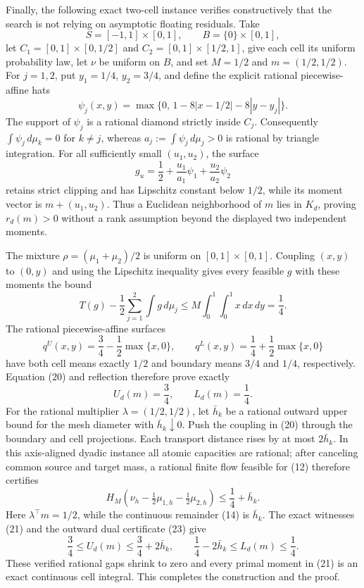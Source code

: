 Finally, the following exact two-cell instance verifies constructively that
the search is not relying on asymptotic floating residuals.  Take
\[
 S=[-1,1]\times[0,1],\qquad B=\{0\}\times[0,1],
\]
let \(C_1=[0,1]\times[0,1/2]\) and
\(C_2=[0,1]\times[1/2,1]\), give each cell its uniform probability law, let
\(\nu\) be uniform on \(B\), and set \(M=1/2\) and
\(m=(1/2,1/2)\).  For \(j=1,2\), put \(y_1=1/4\), \(y_2=3/4\), and define the
explicit rational piecewise-affine hats
\[
 \psi_j(x,y)=\max\{0,\,1-8|x-1/2|-8|y-y_j|\}.
\]
The support of \(\psi_j\) is a rational diamond strictly inside \(C_j\).
Consequently \(\int\psi_j\,d\mu_k=0\) for \(k\neq j\), whereas
\(a_j:=\int\psi_j\,d\mu_j>0\) is rational by triangle integration.  For all
sufficiently small \((u_1,u_2)\), the surface
\[
 g_u=\frac12+\frac{u_1}{a_1}\psi_1+
                  \frac{u_2}{a_2}\psi_2
\]
retains strict clipping and has Lipschitz constant below \(1/2\), while its
moment vector is \(m+(u_1,u_2)\).  Thus a Euclidean neighborhood of \(m\)
lies in \(K_d\), proving \(r_d(m)>0\) without a rank assumption beyond the
displayed two independent moments.

The mixture \(\rho=(\mu_1+\mu_2)/2\) is uniform on
\([0,1]\times[0,1]\).  Coupling \((x,y)\) to \((0,y)\) and using the
Lipschitz inequality gives every feasible \(g\) with these moments the bound
\[
 T(g)-\frac12\sum_{j=1}^2\int g\,d\mu_j
 \leq M\int_0^1\!\int_0^1x\,dx\,dy=\frac14.                \tag{20}
\]
The rational piecewise-affine surfaces
\[
 q^U(x,y)=\frac34-\frac12\max\{x,0\},
 \qquad
 q^L(x,y)=\frac14+\frac12\max\{x,0\}                       \tag{21}
\]
have both cell means exactly \(1/2\) and boundary means \(3/4\) and \(1/4\),
respectively.  Equation (20) and reflection therefore prove exactly
\[
 U_d(m)=\frac34,
 \qquad L_d(m)=\frac14.                                    \tag{22}
\]
For the rational multiplier \(\lambda=(1/2,1/2)\), let \(\bar h_k\) be a
rational outward upper bound for the mesh diameter with
\(\bar h_k\downarrow0\).  Push the coupling in (20) through the boundary and
cell projections.  Each transport distance rises by at most
\(2\bar h_k\).  In this axis-aligned dyadic instance all atomic capacities are
rational; after canceling common source and target mass, a rational finite
flow feasible for (12) therefore certifies
\[
 H_M\!\left(\nu_h-\tfrac12\mu_{1,h}-\tfrac12\mu_{2,h}\right)
 \leq\frac14+\bar h_k.                                     \tag{23}
\]
Here \(\lambda^\top m=1/2\), while the continuous remainder (14) is
\(\bar h_k\).  The exact witnesses (21) and the outward dual certificate (23)
give
\[
 \frac34\leq U_d(m)\leq\frac34+2\bar h_k,
 \qquad
 \frac14-2\bar h_k\leq L_d(m)\leq\frac14.                 \tag{24}
\]
These verified rational gaps shrink to zero and every primal moment in (21)
is an exact continuous cell integral.  This completes the construction and
the proof.
